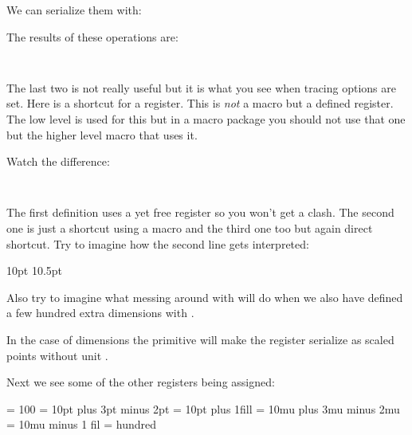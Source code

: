 \typebuffer[1][option=TEX]

We can serialize them with:

\startbuffer[2]
\the    {}
\number {}
\meaning{}
\meaning\scratchdimen
\stopbuffer

\typebuffer[2][option=TEX]

The results of these operations are:

\startlines\tt
\getbuffer[1,2]
\stoplines

The last two is not really useful but it is what you see when tracing options are
set. Here \type {\scratchdimen} is a shortcut for a register. This is {\em not} a
macro but a defined register. The low level \type {\dimendef} is used for this
but in a macro package you should not use that one but the higher level \type
{\newdimen} macro that uses it.

\startbuffer[1]
\newdimen\MyDimenA
\def     \MyDimenB{\dimen999}
\dimendef{}
\stopbuffer

\typebuffer[1][option=TEX]

\startbuffer[2]
\meaning\MyDimenA
\meaning\MyDimenB
\meaning\MyDimenC
\stopbuffer

\typebuffer[2][option=TEX]

Watch the difference:

\pushoverloadmode
\startlines\tt
\getbuffer[1,2]
\stoplines
\popoverloadmode

The first definition uses a yet free register so you won't get a clash. The
second one is just a shortcut using a macro and the third one too but again
direct shortcut. Try to imagine how the second line gets interpreted:

\starttyping[option=TEX]
 
\MyDimenB10pt \MyDimenB10.5pt
 
\stoptyping

Also try to imagine what messing around with \type {\MyDimenC} will do when we
also have defined a few hundred extra dimensions with \type {\newdimen}.

In the case of dimensions the \type {\number} primitive will make the register
serialize as scaled points without unit .

Next we see some of the other registers being assigned:

\starttyping[option=TEX]
 = 100
 = 10pt plus 3pt minus 2pt
 = 10pt plus 1fill
 = 10mu plus 3mu minus 2mu
 = 10mu minus 1 fil
 = {hundred}
\stoptyping

